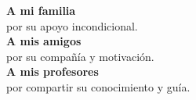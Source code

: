 \begin{dedication}
   



\vspace*{\fill}

\begin{center}
    {\Large \textbf{A mi familia}} \\
    {\footnotesize por su apoyo incondicional.} \vspace{0.5cm} \\
    
    {\Large \textbf{A mis amigos}} \\
    {\footnotesize por su compañía y motivación.} \vspace{0.5cm} \\
    
    {\Large \textbf{A mis profesores}} \\
    {\footnotesize por compartir su conocimiento y guía.}
\end{center}

\vspace*{\fill}


\end{dedication}